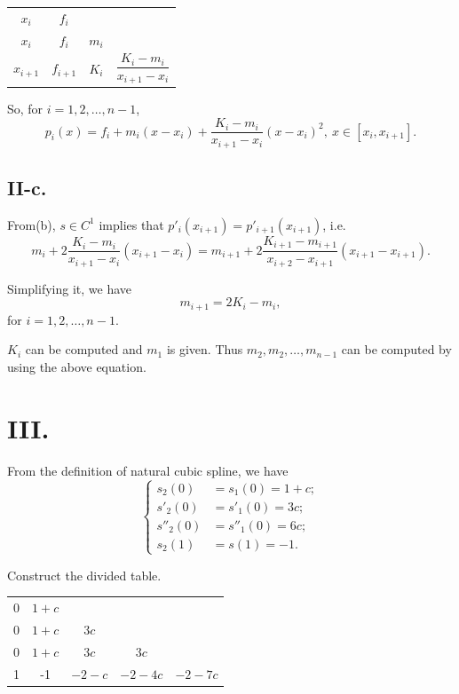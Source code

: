\documentclass[a4paper]{article}
\begin{document}
\begin{table}[!htbp]
  \centering
  \begin{tabular}{c|ccc}
    $x_i$ & $f_i$ & &  \\
    $x_i$ & $f_i$ & $m_i$ &   \\
    $x_{i+1}$ & $f_{i+1}$ & $K_i$ & $\dfrac{K_i-m_i}{x_{i+1}-x_i}$  \\
  \end{tabular}
\end{table}

So, for $i=1,2,\ldots,n-1$, 
$$p_{i}(x)=f_i+m_i(x-x_i)+\dfrac{K_i-m_i}{x_{i+1}-x_i}(x-x_i)^2,\ x\in[x_i,x_{i+1}].$$

\subsection*{II-c.}
From(b), $s\in C^1$ implies that $p'_{i}(x_{i+1})=p'_{i+1}(x_{i+1})$, i.e. 
$$m_i+2\dfrac{K_i-m_i}{x_{i+1}-x_i}(x_{i+1}-x_i) = m_{i+1}+2\dfrac{K_{i+1}-m_{i+1}}{x_{i+2}-x_{i+1}}(x_{i+1}-x_{i+1}).$$

Simplifying it, we have
$$m_{i+1}=2K_i-m_i,$$
for $i=1,2,\ldots,n-1$.

$K_i$ can be computed and $m_1$ is given. Thus $m_{2},m_{2},\ldots,m_{n-1}$ can be computed by using the above equation.

\section*{III.}
From the definition of natural cubic spline, we have
$$
  \left\{\begin{aligned}
    s_2(0)&=s_1(0)=1+c; \\
    s'_2(0)&=s'_1(0)=3c; \\
    s''_2(0)&=s''_1(0)=6c; \\
    s_2(1)&=s(1)=-1.
  \end{aligned}
  \right.
$$

Construct the divided table.

\begin{table}[!htbp]
  \centering
  \begin{tabular}{c|cccc}
    
    0 & $1+c$ & & & \\
    0 & $1+c$ & $3c$ & &  \\
    0 & $1+c$ & $3c$ & $3c$ & \\
    1 & -1 &$-2-c$ & $-2-4c$ & $-2-7c$ \\
  \end{tabular}
\end{table}
\end{document}
